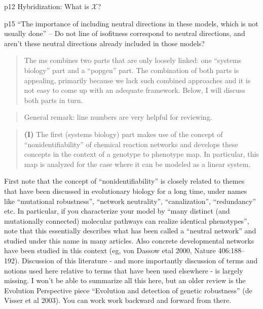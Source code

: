 \begin{point}{p12 Hybridization:}
    What is $\mathcal{X}$?
\end{point}


\begin{point}{p15}
    ``The importance of including neutral directions in these models, which
is not usually done'' -- Do not line of isofitness correspond to neutral
directions, and aren't these neutral directions already included in those
models?
\end{point}





\begin{quote}
The ms combines two parts that are only loosely linked: one ``systems biology''
part and a ``popgen'' part. The combination of both parts is appealing, primarily
because we lack such combined approaches and it is not easy to come up with an
adequate framework. Below, I will discuss both parts in turn.
\end{quote}

\begin{quote}
General remark: line numbers are very helpful for reviewing.  
\end{quote}

\begin{quote}
    \textbf{(I)} The first (systems biology) part makes use of the concept of
``nonidentifiability'' of chemical reaction networks and develops these concepts
in the context of a genotype to phenotype map. In particular, this map is
analyzed for the case where it can be modeled as a linear system.
\end{quote}

\begin{point}{}
    First note that the concept of ``nonidentifiability'' is closely related to
themes that have been discussed in evolutionary biology for a long time, under
names like ``mutational robustness'', ``network neutrality'', ``canalization'',
``redundancy'' etc. In particular, if you characterize your model by ``many
distinct (and mutationally connected) molecular pathways can realize identical
phenotypes'', note that this essentially describes what has been called a
``neutral network'' and studied under this name in many articles. Also concrete
developmental networks have been studied in this context (eg, von Dassow etal
2000, Nature 406:188–192). Discussion of this literature - and more importantly
discussion of terms and notions used here relative to terms that have been used
elsewhere - is largely missing. I won't be able to summarize all this here, but
an older review is the Evolution Perspective piece ``Evolution and detection of
genetic robustness'' (de Visser et al 2003). You can work work backward and
forward from there.  
\end{point}

